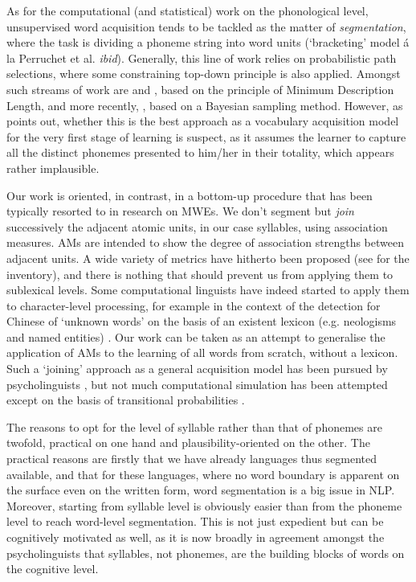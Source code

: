 \documentclass[a4]{article}
\begin{document}
As for the computational (and statistical) work on the phonological level, unsupervised word acquisition tends to be tackled as the matter of \emph{segmentation}, where the task is dividing a phoneme string into word units (`bracketing' model \'a la Perruchet et al. \emph{ibid}). Generally, this line of work relies on probabilistic path selections, where some constraining top-down principle is also applied. Amongst such streams of work are \cite{Goldsmith06_algorithmUnsupervised} and \cite{Brent99}, based on the principle of Minimum Description Length, and more recently, \cite{GoldwaterEtAl09_BayesianFramework}, based on a Bayesian sampling method. However, as \cite{Swingley05_clustering} points out, whether this is the best approach as a vocabulary acquisition model for the very first stage of learning is suspect, as it assumes the learner to capture all the distinct phonemes presented to him/her in their totality, which appears rather implausible.

Our work is oriented, in contrast, in a bottom-up procedure that has been typically resorted to in research on MWEs. We don't segment but \emph{join} successively the adjacent atomic units, in our case syllables, using association measures. AMs are intended to show the degree of association strengths between adjacent units. A wide variety of metrics have hitherto been proposed (see \cite{Pecina09} for the inventory), and there is nothing that should prevent us from applying them to sublexical levels. Some computational linguists have indeed started to apply them to character-level processing, for example in the context of the detection for Chinese of `unknown words' on the basis of an existent lexicon (e.g. neologisms and named entities) \cite{TangEtAl10_boundary,DuEtAl15}. Our work can be taken as an attempt to generalise the application of AMs to the learning of all words from scratch, without a lexicon. Such a `joining' approach as a general acquisition model has been pursued by psycholinguists \cite{Swingley05_clustering}, but not much computational simulation has been attempted except on the basis of transitional probabilities \cite{PerruchetVinter98_parser}. %

The reasons to opt for the level of syllable rather than that of phonemes are twofold, practical on one hand and plausibility-oriented on the other. The practical reasons are firstly that we have already languages thus segmented available, and that for these languages, where no word boundary is apparent on the surface even on the written form, word segmentation is a big issue in NLP. Moreover, starting from syllable level  is obviously easier than from the phoneme level to reach word-level segmentation. This is not just expedient but can be cognitively motivated as well, as it is now broadly in agreement amongst the psycholinguists \cite{BertonciniMehler81} that syllables, not phonemes, are the building blocks of words on the cognitive level.
\end{document}
